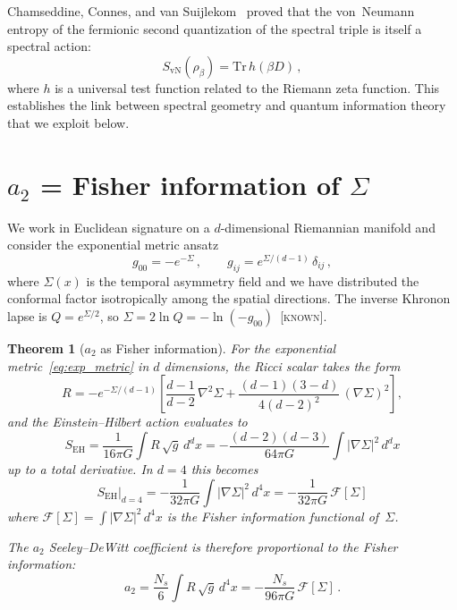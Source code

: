 \documentclass[prd,twocolumn,superscriptaddress,longbibliography]{revtex4-2}
\newtheorem{theorem}{Theorem}
\newcommand{\Tr}{\mathrm{Tr}}
\newcommand{\SvN}{S_{\mathrm{vN}}}
\newcommand{\SEH}{S_{\mathrm{EH}}}
\newcommand{\known}{\textsc{[known]}}
\begin{document}
Chamseddine, Connes, and van Suijlekom~\cite{CCSvS2020}
proved that the von~Neumann entropy of the fermionic second
quantization of the spectral triple is itself a spectral action:
\begin{equation}\label{eq:CCSvS}
  \SvN(\rho_\beta)
  = \Tr\,h(\beta D)\,,
\end{equation}
where $h$ is a universal test function related to the Riemann
zeta function.
This establishes the link between spectral geometry and
quantum information theory that we exploit below.


\section{$a_2$ = Fisher information of $\Sigma$}
\label{sec:a2_fisher}

We work in Euclidean signature on a $d$-dimensional Riemannian
manifold and consider the exponential metric
ansatz~\cite{PaperII}
\begin{equation}\label{eq:exp_metric}
  g_{00} = -e^{-\Sigma}\,,
  \qquad
  g_{ij} = e^{\Sigma/(d-1)}\,\delta_{ij}\,,
\end{equation}
where $\Sigma(x)$ is the temporal asymmetry field and we have
distributed the conformal factor isotropically among the spatial
directions.
The inverse Khronon lapse is $Q = e^{\Sigma/2}$, so
$\Sigma = 2\ln Q = -\ln(-g_{00})$~\known.

\begin{theorem}[$a_2$ as Fisher information]
\label{thm:a2_fisher}
For the exponential metric~\eqref{eq:exp_metric} in
$d$ dimensions, the Ricci scalar takes the form
\begin{equation}\label{eq:R_Sigma}
  R = -e^{-\Sigma/(d-1)}\!\left[
  \frac{d-1}{d-2}\,\nabla^2\Sigma
  + \frac{(d-1)(3-d)}{4(d-2)^2}\,(\nabla\Sigma)^2
  \right]\!,
\end{equation}
and the Einstein--Hilbert action evaluates to
\begin{equation}\label{eq:SEH_Sigma}
  \SEH
  = \frac{1}{16\pi G}\int R\,\sqrt{g}\,d^dx
  = -\frac{(d-2)(d-3)}{64\pi G}\int |\nabla\Sigma|^2\,d^dx
\end{equation}
up to a total derivative.
In $d=4$ this becomes
\begin{equation}\label{eq:SEH_d4}
  \boxed{\;
  \SEH\big|_{d=4}
  = -\frac{1}{32\pi G}\int |\nabla\Sigma|^2\,d^4x
  = -\frac{1}{32\pi G}\,\mathcal{F}[\Sigma]
  \;}
\end{equation}
where $\mathcal{F}[\Sigma] = \int|\nabla\Sigma|^2\,d^4x$ is
the Fisher information functional of~$\Sigma$.

The $a_2$ Seeley--DeWitt coefficient is therefore proportional
to the Fisher information:
\begin{equation}\label{eq:a2_Fisher}
  a_2
  = \frac{N_s}{6}\int R\,\sqrt{g}\,d^4x
  = -\frac{N_s}{96\pi G}\,\mathcal{F}[\Sigma]\,.
\end{equation}
\end{theorem}
\end{document}
